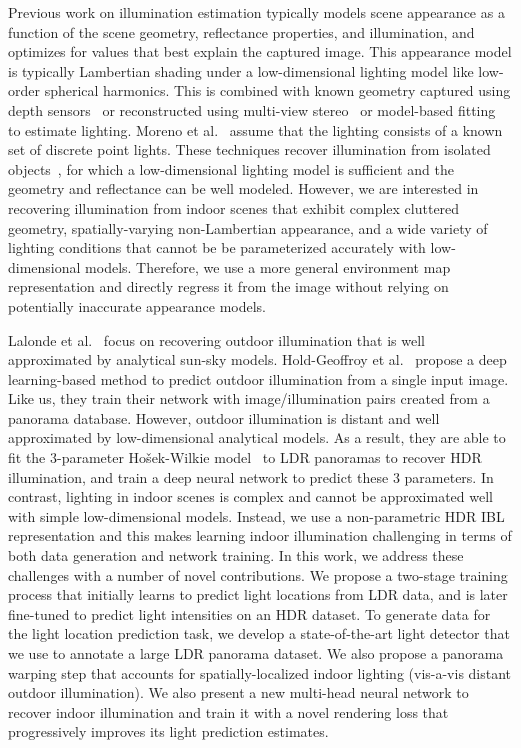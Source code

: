 Previous work on illumination estimation typically models scene appearance as a function of the scene geometry, reflectance properties, and illumination, and optimizes for values that best explain the captured image. This appearance model is typically Lambertian shading under a low-dimensional lighting model like low-order spherical harmonics. This is combined with known geometry captured using depth sensors~\cite{barron2013rgbd} or reconstructed using multi-view stereo~\cite{wu-cvpr-11} or model-based fitting~\cite{valgaerts-tog-12} to estimate lighting. Moreno et al.~ assume that the lighting consists of a known set of discrete point lights. These techniques recover illumination from isolated objects~\cite{lombardi2016reflectance}, for which a low-dimensional lighting model is sufficient and the geometry and reflectance can be well modeled. However, we are interested in recovering illumination from indoor scenes that exhibit complex cluttered geometry, spatially-varying non-Lambertian appearance, and a wide variety of lighting conditions that cannot be be parameterized accurately with low-dimensional models. Therefore, we use a more general environment map representation and directly regress it from the image without relying on potentially inaccurate appearance models.

Lalonde et al.~ focus on recovering outdoor illumination that is well approximated by analytical sun-sky models. Hold-Geoffroy et al.~ propose a deep learning-based method to predict outdoor illumination from a single input image. Like us, they train their network with image/illumination pairs created from a panorama database. However, outdoor illumination is distant and well approximated by low-dimensional analytical models. As a result, they are able to fit the $3$-parameter Ho\v{s}ek-Wilkie model~ to LDR panoramas to recover HDR illumination, and train a deep neural network to predict these $3$ parameters. In contrast, lighting in indoor scenes is complex and cannot be approximated well with simple low-dimensional models. Instead, we use a non-parametric HDR IBL representation and this makes learning indoor illumination challenging in terms of both data generation and network training. In this work, we address these challenges with a number of novel contributions. We propose a two-stage training process that initially learns to predict light locations from LDR data, and is later fine-tuned to predict light intensities on an HDR dataset. To generate data for the light location prediction task, we develop a state-of-the-art light detector that we use to annotate a large LDR panorama dataset. We also propose a panorama warping step that accounts for spatially-localized indoor lighting (vis-a-vis distant outdoor illumination). We also present a new multi-head neural network to recover indoor illumination and train it with a novel rendering loss that progressively improves its light prediction estimates. 

